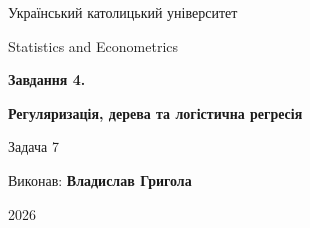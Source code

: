 \documentclass[11pt,a4paper]{article}
\begin{document}
\hypersetup{pageanchor=false}
\begin{titlepage}
\centering
\vspace*{14mm}
{\Large Український католицький університет\par}
\vspace{9mm}
{\large Statistics and Econometrics\par}
\vfill
{\huge\bfseries\color{accent} Завдання 4.\par}
\vspace{4mm}
{\huge\bfseries\color{accent} Регуляризація, дерева та логістична регресія\par}
\vspace{10mm}
{\large Задача 7\par}
\vfill
{\large Виконав: \textbf{Владислав Григола}\par}
\vspace{22mm}
{\large 2026\par}
\end{titlepage}
\hypersetup{pageanchor=true}
\tableofcontents
\clearpage




\end{document}
